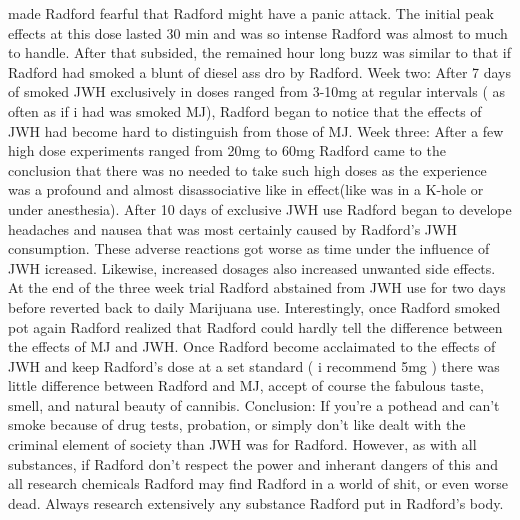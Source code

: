 \documentclass[12pt]{book}
\begin{document}
made Radford fearful that Radford might have a panic attack. The initial peak effects at this dose lasted 30 min and was so intense Radford was almost to much to handle. After that subsided, the remained hour long buzz was similar to that if Radford had smoked a blunt of diesel ass dro by Radford. Week two: After 7 days of smoked JWH exclusively in doses ranged from 3-10mg at regular intervals ( as often as if i had was smoked MJ), Radford began to notice that the effects of JWH had become hard to distinguish from those of MJ. Week three: After a few high dose experiments ranged from 20mg to 60mg Radford came to the conclusion that there was no needed to take such high doses as the experience was a profound and almost disassociative like in effect(like was in a K-hole or under anesthesia). After 10 days of exclusive JWH use Radford began to develope headaches and nausea that was most certainly caused by Radford's JWH consumption. These adverse reactions got worse as time under the influence of JWH icreased. Likewise, increased dosages also increased unwanted side effects. At the end of the three week trial Radford abstained from JWH use for two days before reverted back to daily Marijuana use. Interestingly, once Radford smoked pot again Radford realized that Radford could hardly tell the difference between the effects of MJ and JWH. Once Radford become acclaimated to the effects of JWH and keep Radford's dose at a set standard ( i recommend 5mg ) there was little difference between Radford and MJ, accept of course the fabulous taste, smell, and natural beauty of cannibis. Conclusion: If you're a pothead and can't smoke because of drug tests, probation, or simply don't like dealt with the criminal element of society than JWH was for Radford. However, as with all substances, if Radford don't respect the power and inherant dangers of this and all research chemicals Radford may find Radford in a world of shit, or even worse dead. Always research extensively any substance Radford put in Radford's body.
\end{document}

